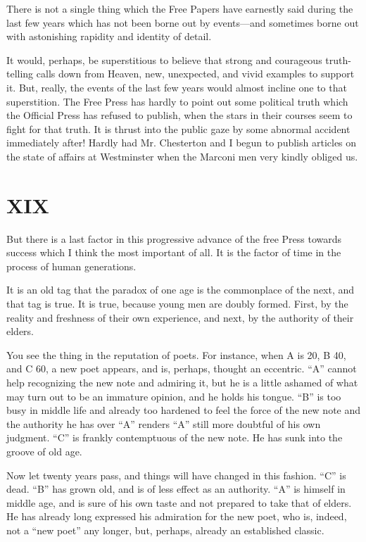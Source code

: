\documentclass{book}
\begin{document}
There is not a single thing which the Free Papers have earnestly said during the last few years which has not been borne out by events—and sometimes borne out with astonishing rapidity and identity of detail.

It would, perhaps, be superstitious to believe that strong and courageous truth-telling calls down from Heaven, new, unexpected, and vivid examples to support it. But, really, the events of the last few years would almost incline one to that superstition. The Free Press has hardly to point out some political truth which the Official Press has refused to publish, when the stars in their courses seem to fight for that truth. It is thrust into the public gaze by some abnormal accident immediately after! Hardly had Mr. Chesterton and I begun to publish articles on the state of affairs at Westminster when the Marconi men very kindly obliged us.

\chapter*{XIX}
\label{chapter-20}
But there is a last factor in this progressive advance of the free Press towards success which I think the most important of all. It is the factor of time in the process of human generations.

It is an old tag that the paradox of one age is the commonplace of the next, and that tag is true. It is true, because young men are doubly formed. First, by the reality and freshness of their own experience, and next, by the authority of their elders.

You see the thing in the reputation of poets. For instance, when A is 20, B 40, and C 60, a new poet appears, and is, perhaps, thought an eccentric. “A” cannot help recognizing the new note and admiring it, but he is a little ashamed of what may turn out to be an immature opinion, and he holds his tongue. “B” is too busy in middle life and already too hardened to feel the force of the new note and the authority he has over “A” renders “A” still more doubtful of his own judgment. “C” is frankly contemptuous of the new note. He has sunk into the groove of old age.

Now let twenty years pass, and things will have changed in this fashion. “C” is dead. “B” has grown old, and is of less effect as an authority. “A” is himself in middle age, and is sure of his own taste and not prepared to take that of elders. He has already long expressed his admiration for the new poet, who is, indeed, not a “new poet” any longer, but, perhaps, already an established classic.
\end{document}
